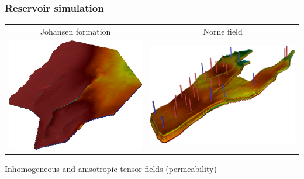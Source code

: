 \documentclass[handout]{beamer}
{
\usepackage{fullpage}
\usepackage{hyperref}
\usepackage{amssymb} 
}
\begin{document}
\begin{frame}
\frametitle{Reservoir simulation}

\begin{tabular}{cc}
Johansen formation & Norne field \\
\includegraphics[totalheight=1.5in,angle=0]{figures/Johansen.png} &
\includegraphics[totalheight=1.5in,angle=0]{figures/NorneModelPermeabilityMap}
\end{tabular}
\begin{center}
Inhomogeneous and anisotropic tensor fields (permeability)
\end{center}
\end{frame}
\end{document}
